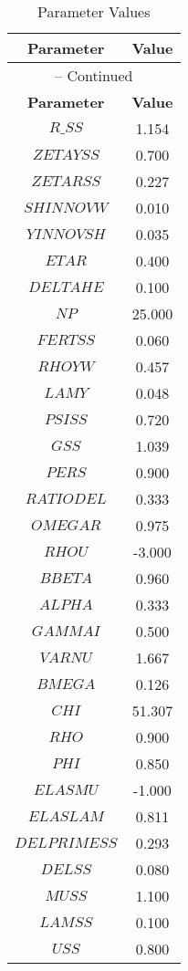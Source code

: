 \begin{center}
\begin{longtable}{cc}
\caption{Parameter Values}\\%
\toprule%
\multicolumn{1}{c}{\textbf{Parameter}} &
\multicolumn{1}{c}{\textbf{Value}}  \\%
\midrule%
\endfirsthead
\multicolumn{2}{c}{{\tablename} \thetable{} -- Continued}\\%
\midrule%
\multicolumn{1}{c}{\textbf{Parameter}} &
\multicolumn{1}{c}{\textbf{Value}} \\%
\midrule%
\endhead
$R\_SS$ 	 & 	 1.154 \\
$ZETAYSS$ 	 & 	 0.700 \\
$ZETARSS$ 	 & 	 0.227 \\
$SHINNOVW$ 	 & 	 0.010 \\
$YINNOVSH$ 	 & 	 0.035 \\
$ETAR$ 	 & 	 0.400 \\
$DELTAHE$ 	 & 	 0.100 \\
$NP$ 	 & 	 25.000 \\
$FERTSS$ 	 & 	 0.060 \\
$RHOYW$ 	 & 	 0.457 \\
$LAMY$ 	 & 	 0.048 \\
$PSISS$ 	 & 	 0.720 \\
$GSS$ 	 & 	 1.039 \\
$PERS$ 	 & 	 0.900 \\
$RATIODEL$ 	 & 	 0.333 \\
$OMEGAR$ 	 & 	 0.975 \\
$RHOU$ 	 & 	 -3.000 \\
$BBETA$ 	 & 	 0.960 \\
$ALPHA$ 	 & 	 0.333 \\
$GAMMAI$ 	 & 	 0.500 \\
$VARNU$ 	 & 	 1.667 \\
$BMEGA$ 	 & 	 0.126 \\
$CHI$ 	 & 	 51.307 \\
$RHO$ 	 & 	 0.900 \\
$PHI$ 	 & 	 0.850 \\
$ELASMU$ 	 & 	 -1.000 \\
$ELASLAM$ 	 & 	 0.811 \\
$DELPRIMESS$ 	 & 	 0.293 \\
$DELSS$ 	 & 	 0.080 \\
$MUSS$ 	 & 	 1.100 \\
$LAMSS$ 	 & 	 0.100 \\
$USS$ 	 & 	 0.800 \\

\end{longtable}
\end{center}
